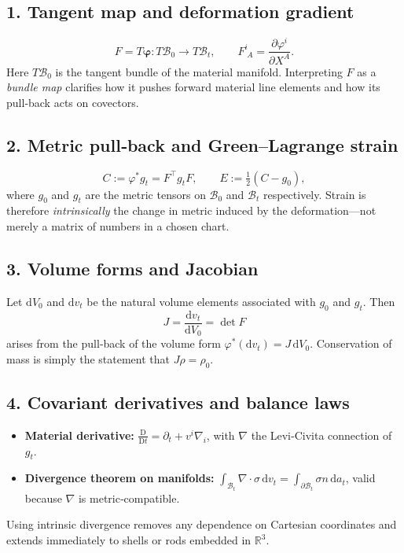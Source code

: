 \documentclass[12pt]{article}
\theoremstyle{definition} %
\theoremstyle{plain} %
\begin{document}
\subsection*{1.  Tangent map and deformation gradient}
\[
	F = T\boldsymbol{\varphi} : T\mathcal{B}_0 \longrightarrow T\mathcal{B}_t ,
	\qquad 
	F^i_{\;A} = \frac{\partial \varphi^i}{\partial X^A} .
\]
Here $T\mathcal{B}_0$ is the tangent bundle of the material manifold.
Interpreting $F$ as a \emph{bundle map} clarifies how it pushes forward
material line elements and how its pull‑back acts on covectors.

\subsection*{2.  Metric pull‑back and Green–Lagrange strain}
\[
	C := \varphi^{\!*}g_t = F^\top g_t F ,
	\qquad
	E := \tfrac12\!\left(C - g_0\right) ,
\]
where $g_0$ and $g_t$ are the metric tensors on
$\mathcal{B}_0$ and $\mathcal{B}_t$ respectively.
Strain is therefore \textit{intrinsically} the change in metric induced
by the deformation—not merely a matrix of numbers in a chosen chart.

\subsection*{3.  Volume forms and Jacobian}
Let $\mathrm{d}V_0$ and $\mathrm{d}v_t$ be the natural volume
elements associated with $g_0$ and $g_t$.
Then
\[
	J = \frac{\mathrm{d}v_t}{\mathrm{d}V_0} = \det F
\]
arises from the pull‑back of the volume form
$\varphi^{\!*}(\mathrm{d}v_t) = J\,\mathrm{d}V_0$.
Conservation of mass is simply the statement that $J\rho = \rho_0$.

\subsection*{4.  Covariant derivatives and balance laws}
\begin{itemize}
  \item \textbf{Material derivative:} 
        $\displaystyle \frac{\mathrm{D}}{\mathrm{D}t} = 
           \partial_t + v^i\nabla_i$,
        with $\nabla$ the Levi‑Civita connection of $g_t$.
  \item \textbf{Divergence theorem on manifolds:} 
        $\displaystyle \int_{\mathcal{B}_t}\!\!\nabla\!\cdot\!\sigma\,\mathrm{d}v_t
        = \int_{\partial\mathcal{B}_t}\!\!\sigma n\,\mathrm{d}a_t$,
        valid because $\nabla$ is metric‑compatible.
\end{itemize}
Using intrinsic divergence removes any dependence on Cartesian
coordinates and extends immediately to shells or rods embedded in
$\mathbb{R}^3$.
\end{document}
